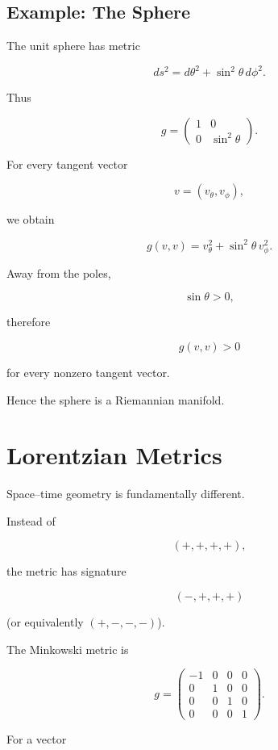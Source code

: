 \documentclass[12pt,a4paper]{article}
\theoremstyle{notespace}
\begin{document}

\subsection{Example: The Sphere}

The unit sphere has metric

\[
ds^2
=
d\theta^2
+
\sin^2\theta\,d\phi^2.
\]

Thus

\[
g=
\begin{pmatrix}
	1&0\\
	0&\sin^2\theta
\end{pmatrix}.
\]

For every tangent vector

\[
v=(v_\theta,v_\phi),
\]

we obtain

\[
g(v,v)
=
v_\theta^2
+
\sin^2\theta\,v_\phi^2.
\]

Away from the poles,

\[
\sin\theta>0,
\]

therefore

\[
g(v,v)>0
\]

for every nonzero tangent vector.

Hence the sphere is a Riemannian manifold.


\section{Lorentzian Metrics}

Space--time geometry is fundamentally different.

Instead of

\[
(+,+,+,+),
\]

the metric has signature

\[
(-,+,+,+)
\]

(or equivalently $(+,-,-,-)$).

The Minkowski metric is

\[
g=
\begin{pmatrix}
	-1&0&0&0\\
	0&1&0&0\\
	0&0&1&0\\
	0&0&0&1
\end{pmatrix}.
\]

For a vector
\end{document}
